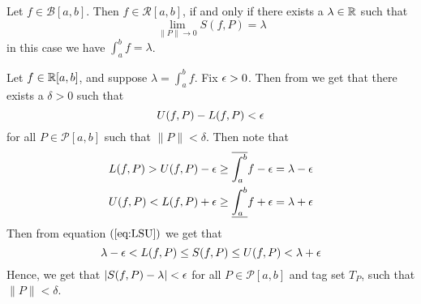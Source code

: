 \begin{thm}\label{thm1:feb4}
    Let $f \in \mathcal{B}[a,b]$. Then $f \in \mathcal{R}[a,b]$, if and only if there exists a $\lambda \in \mathbb{R}$ such that \[ \lim_{\|P\| \to 0} S(f,P) = \lambda\]
    in this case we have $\int_a^b f = \lambda$.
\end{thm}
\begin{prf}
    Let $f \in \mathbb{R}[a,b]$, and suppose $\lambda = \int_a^b f$. Fix $\epsilon > 0$. Then from  we get that there exists a $\delta > 0$ such that 
    \[ U(f,P) - L(f,P) < \epsilon \]
    for all $P \in \mathcal{P}[a,b]$ such that $\|P\| < \delta$. Then note that 
    \begin{align*}
        L(f,P) > U(f,P) - \epsilon \geq \overline{\int_a^b}f - \epsilon = \lambda - \epsilon \\ 
        U(f,P) < L(f,P) + \epsilon \geq \underline{\int_a^b}f + \epsilon = \lambda + \epsilon
    \end{align*}
    Then from equation $(\ref{eq:LSU})$ we get that 
    \[ \lambda - \epsilon < L(f,P) \leq S(f,P) \leq U(f,P) < \lambda + \epsilon \]
    Hence, we get that $|S(f,P) - \lambda| < \epsilon$ for all $P \in \mathcal{P}[a,b]$ and tag set $T_P$, such that $\|P\| < \delta$.


\end{prf}
